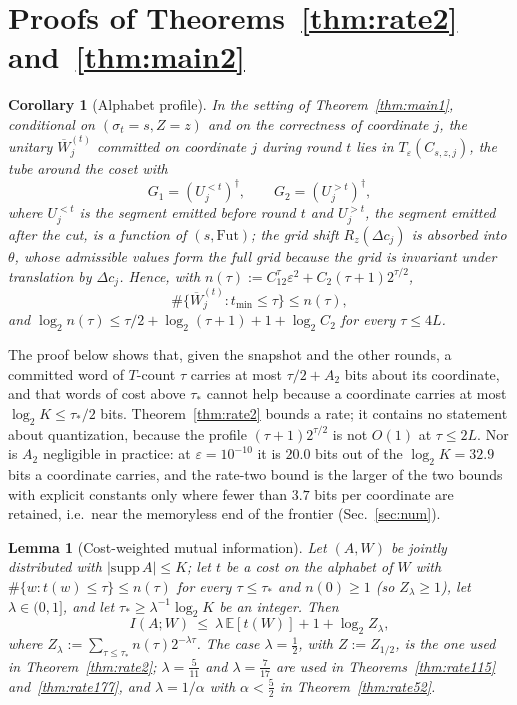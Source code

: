 \documentclass[aps,prx,twocolumn,superscriptaddress,nofootinbib,longbibliography]{revtex4-2}
\theoremstyle{plain}
\newtheorem{lemma}{Lemma}
\newtheorem{corollary}{Corollary}
\theoremstyle{definition}
\theoremstyle{remark}
\newcommand{\E}{\mathbb{E}}
\begin{document}
\section{Proofs of Theorems~\ref{thm:rate2} and~\ref{thm:main2}}\label{app:rate}

\begin{corollary}[Alphabet profile]\label{cor:profile}
In the setting of Theorem~\ref{thm:main1}, conditional on $(\sigma_t=s,Z=z)$ and on the correctness of coordinate $j$, the unitary $\overline W^{(t)}_j$ committed on coordinate $j$ during round $t$ lies in $T_\varepsilon(C_{s,z,j})$, the tube around the coset with
\[G_1=(U^{<t}_j)^\dagger,\qquad G_2=(U^{>t}_j)^\dagger,\]
where $U^{<t}_j$ is the segment emitted before round $t$ and $U^{>t}_j$, the segment emitted after the cut, is a function of $(s,\mathrm{Fut})$; the grid shift $R_z(\Delta c_j)$ is absorbed into $\theta$, whose admissible values form the full grid because the grid is invariant under translation by $\Delta c_j$. Hence, with $n(\tau):=C_12^\tau\varepsilon^2+C_2(\tau+1)2^{\tau/2}$,
\[\#\{\overline W^{(t)}_j:t_{\min}\le\tau\}\le n(\tau),\]
and $\log_2n(\tau)\le\tau/2+\log_2(\tau+1)+1+\log_2C_2$ for every $\tau\le4L$.
\end{corollary}
The proof below shows that, given the snapshot and the other rounds, a committed word of $T$-count $\tau$ carries at most $\tau/2+A_2$ bits about its coordinate, and that words of cost above $\tau_*$ cannot help because a coordinate carries at most $\log_2K\le\tau_*/2$ bits. Theorem~\ref{thm:rate2} bounds a rate; it contains no statement about quantization, because the profile $(\tau+1)2^{\tau/2}$ is not $O(1)$ at $\tau\le2L$. Nor is $A_2$ negligible in practice: at $\varepsilon=10^{-10}$ it is $20.0$ bits out of the $\log_2K=32.9$ bits a coordinate carries, and the rate-two bound is the larger of the two bounds with explicit constants only where fewer than $3.7$ bits per coordinate are retained, i.e.\ near the memoryless end of the frontier (Sec.~\ref{sec:num}).
\begin{lemma}[Cost-weighted mutual information]\label{lem:gibbs}
Let $(A,W)$ be jointly distributed with $|\mathrm{supp}\,A|\le K$; let $t$ be a cost on the alphabet of $W$ with $\#\{w:t(w)\le\tau\}\le n(\tau)$ for every $\tau\le\tau_*$ and $n(0)\ge1$ (so $Z_\lambda\ge1$), let $\lambda\in(0,1]$, and let $\tau_*\ge\lambda^{-1}\log_2K$ be an integer. Then
\begin{equation}
I(A;W)\ \le\ \lambda\,\E[t(W)]+1+\log_2Z_\lambda,
\end{equation}
where $Z_\lambda:=\sum_{\tau\le\tau_*}n(\tau)2^{-\lambda\tau}$. The case $\lambda=\tfrac12$, with $Z:=Z_{1/2}$, is the one used in Theorem~\ref{thm:rate2}; $\lambda=\tfrac5{11}$ and $\lambda=\tfrac7{17}$ are used in Theorems~\ref{thm:rate115} and~\ref{thm:rate177}, and $\lambda=1/\alpha$ with $\alpha<\tfrac52$ in Theorem~\ref{thm:rate52}.
\end{lemma}
\end{document}
